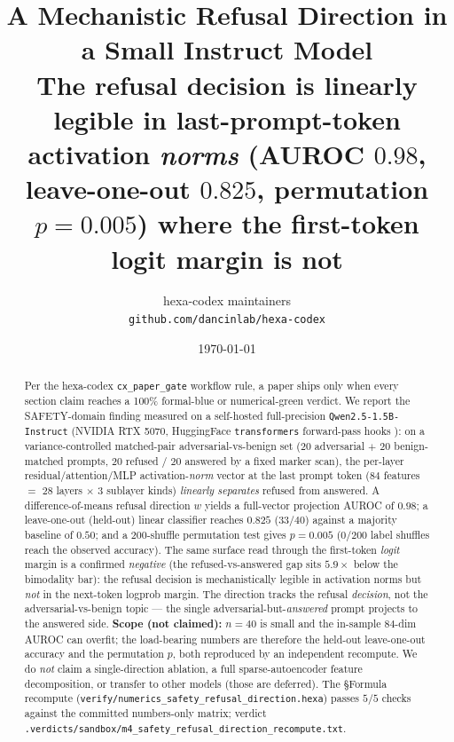 \documentclass[11pt,a4paper]{article}
\title{
  \textbf{A Mechanistic Refusal Direction in a Small Instruct Model}\\[4pt]
  \large The refusal decision is linearly legible in last-prompt-token
  activation \emph{norms} (AUROC \(0.98\), leave-one-out \(0.825\),
  permutation \(p{=}0.005\)) where the first-token logit margin is not
}
\author{hexa-codex maintainers \\ \texttt{github.com/dancinlab/hexa-codex}}
\date{\today}
\begin{document}
\maketitle

\begin{abstract}
Per the hexa-codex \texttt{cx\_paper\_gate} workflow rule, a paper ships only
when every section claim reaches a 100\% formal-blue or numerical-green verdict.
We report the SAFETY-domain finding measured on a self-hosted full-precision
\texttt{Qwen2.5-1.5B-Instruct} \citep{qwen25} (NVIDIA RTX 5070, HuggingFace
\texttt{transformers} forward-pass hooks \citep{huggingface_transformers}): on a
variance-controlled matched-pair adversarial-vs-benign set (\(20\) adversarial
\(+\) \(20\) benign-matched prompts, \(20\) refused \(/\) \(20\) answered by a
fixed marker scan), the per-layer residual/attention/MLP activation-\emph{norm}
vector at the last prompt token (\(84\) features \(=\) \(28\) layers \(\times\)
\(3\) sublayer kinds) \emph{linearly separates} refused from answered. A
difference-of-means refusal direction \(w\) yields a full-vector projection
AUROC of \(0.98\); a leave-one-out (held-out) linear classifier reaches
\(0.825\) (\(33/40\)) against a majority baseline of \(0.50\); and a
\(200\)-shuffle permutation test gives \(p{=}0.005\) (\(0/200\) label shuffles
reach the observed accuracy). The same surface read through the first-token
\emph{logit} margin is a confirmed \emph{negative} (the refused-vs-answered gap
sits \(5.9\times\) below the bimodality bar): the refusal decision is
mechanistically legible in activation norms but \emph{not} in the next-token
logprob margin. The direction tracks the refusal \emph{decision}, not the
adversarial-vs-benign topic --- the single adversarial-but-\emph{answered}
prompt projects to the answered side. \textbf{Scope (not claimed):} \(n{=}40\)
is small and the in-sample \(84\)-dim AUROC can overfit; the load-bearing
numbers are therefore the held-out leave-one-out accuracy and the permutation
\(p\), both reproduced by an independent recompute. We do \emph{not} claim a
single-direction ablation, a full sparse-autoencoder feature decomposition, or
transfer to other models (those are deferred). The \S Formula recompute
(\texttt{verify/numerics\_safety\_refusal\_direction.hexa}) passes \(5/5\)
checks against the committed numbers-only matrix; verdict
\texttt{.verdicts/sandbox/m4\_safety\_refusal\_direction\_recompute.txt}.
\end{abstract}
\end{document}
